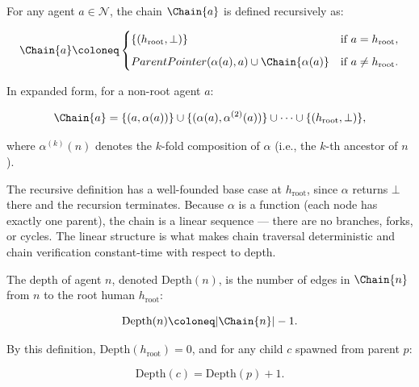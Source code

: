 \begin{dfn}
\label{dfn:chain-operator}
For any agent $a \in \mathcal{N}$, the chain $\Chain{a}$ is defined recursively as:

\begin{equation}
\label{eq:chain-operator}
\Chain{a} \coloneq
\begin{cases}
\{(h_{\text{root}}, \bot)\} & \text{if } a = h_{\text{root}}, \\[6pt]
ParentPointer(\alpha(a), a) \cup \Chain{\alpha(a)} & \text{if } a \neq h_{\text{root}}.
\end{cases}
\end{equation}

In expanded form, for a non-root agent $a$:

\begin{equation}
\label{eq:chain-expanded}
\Chain{a} = \{(a, \alpha(a))\} \cup \{(\alpha(a), \alpha^{(2)}(a))\} \cup \cdots \cup \{(h_{\text{root}}, \bot)\},
\end{equation}

where $\alpha^{(k)}(n)$ denotes the $k$-fold composition of $\alpha$ (i.e., the $k$-th ancestor of $n$).
\end{dfn}

The recursive definition has a well-founded base case at $h_{\text{root}}$, since $\alpha$ returns $\bot$ there and the recursion terminates. Because $\alpha$ is a function (each node has exactly one parent), the chain is a linear sequence — there are no branches, forks, or cycles. The linear structure is what makes chain traversal deterministic and chain verification constant-time with respect to depth.

\begin{dfn}
\label{dfn:chain-depth}
The depth of agent $n$, denoted $\text{Depth}(n)$, is the number of edges in $\Chain{n}$ from $n$ to the root human $h_{\text{root}}$:

\begin{equation}
\label{eq:depth-definition}
\text{Depth}(n) \coloneq |\Chain{n}| - 1.
\end{equation}

By this definition, $\text{Depth}(h_{\text{root}}) = 0$, and for any child $c$ spawned from parent $p$:

\begin{equation}
\label{eq:depth-recursion}
\text{Depth}(c) = \text{Depth}(p) + 1.
\end{equation}
\end{dfn}

